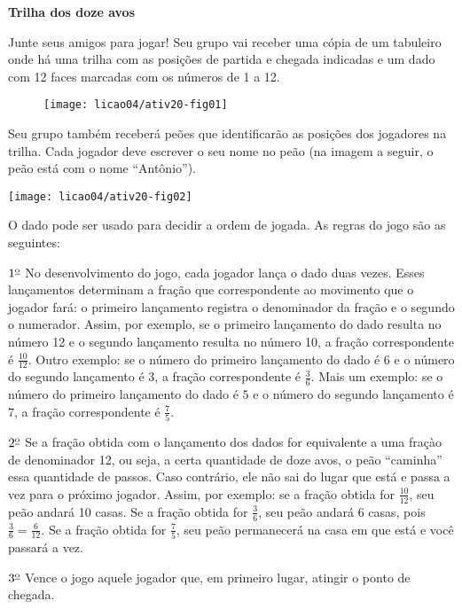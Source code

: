 \begin{atividade}{}\label{chap4-ativ20}

{\bfseries Trilha dos doze avos}

Junte seus amigos para jogar! Seu grupo vai receber uma cópia de um tabuleiro onde há uma trilha com as posições de partida e chegada indicadas e um dado com 12 faces marcadas com os números de 1 a 12.

\begin{figure}[H]
\centering

\texttt{[image: licao04/ativ20-fig01]}
\end{figure}

Seu grupo também receberá peões que identificarão as posições dos jogadores na trilha. Cada jogador deve escrever o seu nome no peão (na imagem a seguir, o peão está com o nome ``Antônio'').
\begin{center}
\texttt{[image: licao04/ativ20-fig02]}
\end{center}
O dado pode ser usado para decidir a ordem de jogada. As regras do jogo são as seguintes:


$1^{\textrm{\underline{o}}}$ No desenvolvimento do jogo, cada jogador lança o dado duas vezes. Esses lançamentos determinam a fração que correspondente ao movimento que o jogador fará: o primeiro lançamento registra o denominador da fração e o segundo o numerador. Assim, por exemplo, se o primeiro lançamento do dado resulta no número 12 e o segundo lançamento resulta no número 10, a fração correspondente é $\frac{10}{12}$. Outro exemplo: se o número do primeiro lançamento do dado é $6$ e o número do segundo lançamento é $3$, a fração correspondente é $\frac{3}{6}$. Mais um exemplo: se o número do primeiro lançamento do dado é $5$ e o número do segundo lançamento é $7$, a fração correspondente é $\frac{7}{5}$.

$2^{\textrm{\underline{o}}}$ Se a fração obtida com o lançamento dos dados for equivalente a uma fraçào de denominador 12, ou seja, a certa quantidade de doze avos, o peão ``caminha'' essa quantidade de passos. Caso contrário, ele não sai do lugar que está e passa a vez para o próximo jogador. Assim, por exemplo: se a fração obtida for $\frac{10}{12}$, seu peão andará 10 casas. Se a fração obtida for $\frac{3}{6}$, seu peão andará $6$ casas, pois $\frac{3}{6} = \frac{6}{12}$. Se a fração obtida for $\frac{7}{5}$, seu peão permanecerá na casa em que está e você passará a vez.

$3^{\textrm{\underline{o}}}$ Vence o jogo aquele jogador que, em primeiro lugar, atingir o ponto de chegada.


\end{atividade}
